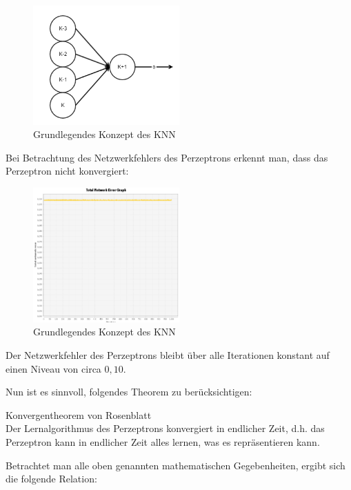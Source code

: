 \begin{figure}[H]
\centering
		\includegraphics[width=0.5\textwidth]{Testperzeptron.png}
	\caption{Grundlegendes Konzept des KNN}
	\label{fig:Grundlegendes Konzept des KNN}
\end{figure}

Bei Betrachtung des Netzwerkfehlers des Perzeptrons erkennt man, dass das Perzeptron nicht konvergiert:

\begin{figure}[H]
\centering
		\includegraphics[width=0.5\textwidth]{MSEperzeptron.png}
	\caption{Grundlegendes Konzept des KNN}
	\label{fig:Grundlegendes Konzept des KNN}
\end{figure}

Der Netzwerkfehler des Perzeptrons bleibt über alle Iterationen konstant auf einen Niveau von circa $0,10$.

Nun ist es sinnvoll, folgendes Theorem zu berücksichtigen:
 
\begin{theo}Konvergentheorem von Rosenblatt\\
Der Lernalgorithmus des Perzeptrons konvergiert in endlicher Zeit, d.h. das Perzeptron kann in endlicher Zeit alles lernen, was es repräsentieren kann.
\end{theo}

Betrachtet man alle oben genannten mathematischen Gegebenheiten, ergibt sich die folgende Relation:

